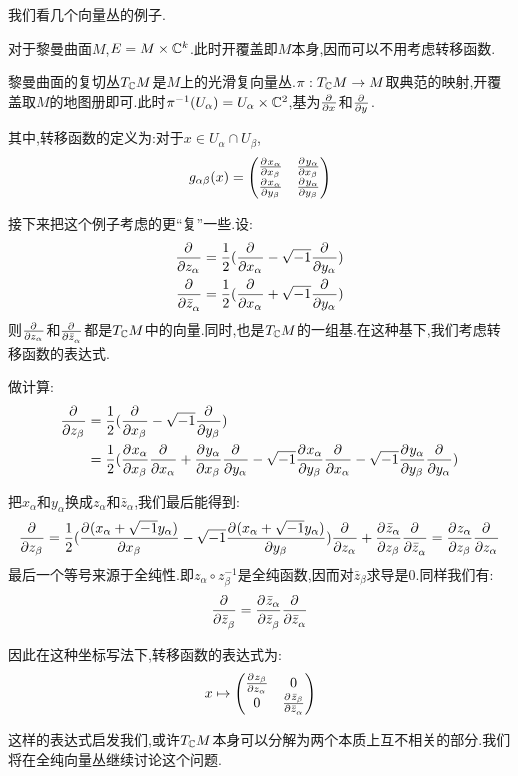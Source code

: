 我们看几个向量丛的例子.
\begin{example}
	对于黎曼曲面$M$,$E=M\times \C^k$.此时开覆盖即$M$本身,因而可以不用考虑转移函数.
\end{example}
\begin{example}
	黎曼曲面的复切丛$T_{\C}M$是$M$上的光滑复向量丛.$\pi:T_{\C}M \to M$取典范的映射,开覆盖取$M$的地图册即可.此时$\pi^{-1}(U_\alpha)=U_\alpha \times \C^2$,基为$\pa{}{x}$和$\pa{}{y}$.

	其中,转移函数的定义为:对于$x\in U_\alpha\cap U_\beta$,
	\begin{align*}
		g_{\alpha\beta}(x)=\begin{pmatrix}
			\pa{x_\alpha}{x_\beta}&\pa{y_\alpha}{x_\beta}\\
			\pa{x_\alpha}{y_\beta}&\pa{y_\alpha}{y_\beta}\end{pmatrix}
	\end{align*}

   接下来把这个例子考虑的更“复”一些.设:
   \begin{align*}
	\pa{}{z_\alpha}=\frac{1}{2}(\pa{}{x_\alpha}-\ii\pa{}{y_\alpha})\\
	\pa{}{\bar{z}_\alpha}=\frac{1}{2}(\pa{}{x_\alpha}+\ii\pa{}{y_\alpha})
   \end{align*}
   则$\pa{}{z_\alpha}$和$\pa{}{\bar{z}_\alpha}$都是$T_{\C}M$中的向量.同时,也是$T_{\C}M$的一组基.在这种基下,我们考虑转移函数的表达式.

   做计算:
   \begin{align*}
	\pa{}{z_\beta}&=\frac{1}{2}(\pa{}{x_\beta}-\ii \pa{}{y_\beta})\\&=\frac{1}{2}(\pa{x_\alpha}{x_\beta}\pa{}{x_\alpha}+\pa{y_\alpha}{x_\beta}\pa{}{y_\alpha}-\ii \pa{x_\alpha}{y_\beta}\pa{}{x_\alpha}-\ii\pa{y_\alpha}{y_\beta}\pa{}{y_\alpha})
   \end{align*}

   把$x_\alpha$和$y_\alpha$换成$z_\alpha$和$\bar{z}_\alpha$,我们最后能得到:
   \begin{align*}
	\pa{}{z_\beta}=\frac{1}{2}(\pa{(x_\alpha+\ii y_\alpha)}{x_\beta}-\ii\pa{(x_\alpha+\ii y_\alpha)}{y_\beta})\pa{}{z_\alpha}+\pa{\bar{z}_\alpha}{z_\beta}\pa{}{\bar{z}_\alpha}=\pa{z_\alpha}{z_\beta}\pa{}{z_\alpha}
   \end{align*}
   最后一个等号来源于全纯性.即$z_\alpha\circ z_\beta^{-1}$是全纯函数,因而对$\bar{z}_\beta$求导是$0$.同样我们有:
   \begin{align*}
	\pa{}{\bar{z}_\beta}=\pa{\bar{z}_\alpha}{\bar{z}_\beta}\pa{}{\bar{z}_\alpha}
   \end{align*}

   因此在这种坐标写法下,转移函数的表达式为:
   \begin{align*}
	x \mapsto \begin{pmatrix}
		\pa{z_\beta}{z_\alpha}&0\\
		0&\pa{\bar{z}_\beta}{\bar{z}_\alpha}
	\end{pmatrix}
   \end{align*}

   这样的表达式启发我们,或许$T_{\C}M$本身可以分解为两个本质上互不相关的部分.我们将在全纯向量丛继续讨论这个问题.
\end{example}
